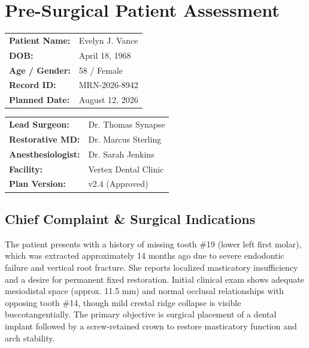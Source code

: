 \section{Pre-Surgical Patient Assessment}

\noindent
\begin{minipage}[t]{0.48\textwidth}
    \begin{tcolorbox}[surgicalbox, title=Patient Identification]
        \begin{tabular}{ll}
            \textbf{Patient Name:} & Evelyn J. Vance \\
            \textbf{DOB:}          & April 18, 1968 \\
            \textbf{Age / Gender:} & 58 / Female \\
            \textbf{Record ID:}    & MRN-2026-8942 \\
            \textbf{Planned Date:} & August 12, 2026
        \end{tabular}
    \end{tcolorbox}
\end{minipage}
\hfill
\begin{minipage}[t]{0.48\textwidth}
    \begin{tcolorbox}[surgicalbox, title=Clinical Team]
        \begin{tabular}{ll}
            \textbf{Lead Surgeon:} & Dr. Thomas Synapse \\
            \textbf{Restorative MD:} & Dr. Marcus Sterling \\
            \textbf{Anesthesiologist:} & Dr. Sarah Jenkins \\
            \textbf{Facility:} & Vertex Dental Clinic \\
            \textbf{Plan Version:} & v2.4 (Approved)
        \end{tabular}
    \end{tcolorbox}
\end{minipage}

\vspace{0.4cm}

\subsection{Chief Complaint \& Surgical Indications}
The patient presents with a history of missing tooth \#19 (lower left first molar), which was extracted approximately 14 months ago due to severe endodontic failure and vertical root fracture. She reports localized masticatory insufficiency and a desire for permanent fixed restoration. Initial clinical exam shows adequate mesiodistal space (approx. 11.5 mm) and normal occlusal relationships with opposing tooth \#14, though mild crestal ridge collapse is visible buccotangentially. The primary objective is surgical placement of a dental implant followed by a screw-retained crown to restore masticatory function and arch stability.

